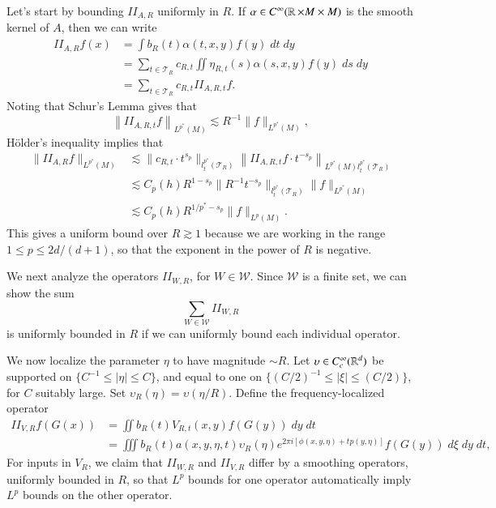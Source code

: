 Let's start by bounding $II_{A,R}$ uniformly in $R$. If $\alpha \in C^\infty(\operatorname{\mathbb{R}} \times M \times M)$ is the smooth kernel of $A$, then we can write
%
\begin{align*}
    II_{A,R} f(x) &= \int b_R(t) \alpha(t,x,y) f(y)\; dt\; dy\\
    &= \sum_{t \in \mathcal{T}_R} c_{R,t} \iint \eta_{R,t}(s) \alpha(s,x,y) f(y)\; ds\; dy\\
    &= \sum_{t \in \mathcal{T}_R} c_{R,t} II_{A,R,t} f.
\end{align*}
%
Noting that Schur's Lemma gives that
%
\[ \left\| II_{A,R,t} f \right\|_{L^{p^*}(M)} \lesssim R^{-1} \| f \|_{L^{p^*}(M)}, \]
%
H\"{o}lder's inequality implies that
%
\begin{align*}
    \| II_{A,R} f \|_{L^{p^*}(M)} &\lesssim \| c_{R,t} \cdot t^{s_p} \|_{l^{p^*}_t(\mathcal{T}_R)} \left\| II_{A,R,t} f \cdot t^{-s_p} \right\|_{L^{p^*}(M) l^{p^*}_t(\mathcal{T}_R)}\\
    &\lesssim C_p(h) R^{1 - s_p} \| R^{-1} t^{-s_p} \|_{l^{p^*}_t(\mathcal{T}_R)} \| f \|_{L^{p^*}(M)}\\
    &\lesssim C_p(h) R^{1/p^* - s_p} \| f \|_{L^p(M)}.
\end{align*}
%
This gives a uniform bound over $R \gtrsim 1$ because we are working in the range $1 \leq p \leq 2d/(d+1)$, so that the exponent in the power of $R$ is negative.


We next analyze the operators $II_{W,R}$, for $W \in \mathcal{W}$. Since $\mathcal{W}$ is a finite set, we can show the sum
%
\[ \sum_{W \in \mathcal{W}} II_{W,R} \]
%
is uniformly bounded in $R$ if we can uniformly bound each individual operator.

We now localize the parameter $\eta$ to have magnitude $\sim R$. Let $\upsilon \in C_c^\infty(\operatorname{\mathbb{R}}^d)$ be supported on $\{ C^{-1} \leq |\eta| \leq C \}$, and equal to one on $\{ (C/2)^{-1} \leq |\xi| \leq (C/2) \}$, for $C$ suitably large. Set $\upsilon_R(\eta) = \upsilon( \eta / R)$. Define the frequency-localized operator
%
\begin{align*}
    II_{V,R} f(G(x)) &= \iint b_R(t) V_{R,t}(x,y) f(G(y))\; dy\; dt\\
    &= \iiint b_R(t) a(x,y,\eta,t) \upsilon_R(\eta) e^{2 \pi i [\phi(x,y,\eta) + t p(y,\eta)]} f(G(y))\; d\xi\; dy\; dt,
\end{align*}
%
For inputs in $V_R$, we claim that $II_{W,R}$ and $II_{V,R}$ differ by a smoothing operators, uniformly bounded in $R$, so that $L^p$ bounds for one operator automatically imply $L^p$ bounds on the other operator.

